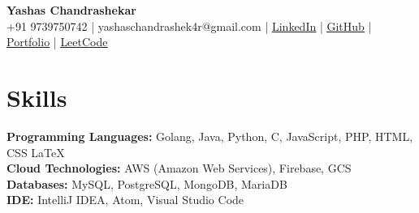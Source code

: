 \documentclass[a4paper,15pt]{article}
\begin{document}
\pagestyle{empty}

\begin{center}
    \textbf{\LARGE Yashas Chandrashekar} \\
    \vspace{1mm}
    +91 9739750742 | yashaschandrashek4r@gmail.com | \href{https://linkedin.com/in/yashaschandrashekar}{\underline{LinkedIn}} | \href{https://github.com/yashasc2k1}{\underline{GitHub}} | \href{https://yashasc2k1.github.io/YashasChandrashekar/}{\underline{Portfolio}} | \href{https://leetcode.com/YashasC/}{\underline{LeetCode}}
\end{center}

\section*{Skills}
\textbf{Programming Languages:}
Golang, Java, Python, C, JavaScript, PHP, HTML, CSS \LaTeX \\
\textbf{Cloud Technologies:}
AWS (Amazon Web Services), Firebase, GCS \\
\textbf{Databases:}
MySQL, PostgreSQL, MongoDB, MariaDB\\
\textbf{IDE:}
IntelliJ IDEA, Atom, Visual Studio Code

\end{document}

